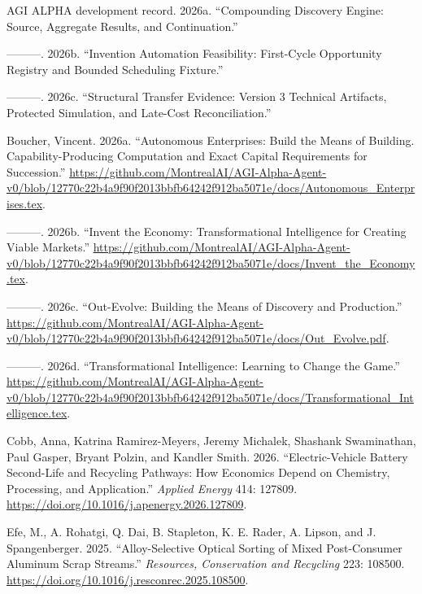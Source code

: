 \label{refs}
\begin{CSLReferences}{1}{0}
AGI ALPHA development record. 2026a. {``Compounding Discovery Engine:
Source, Aggregate Results, and Continuation.''}

---------. 2026b. {``Invention Automation Feasibility: First-Cycle
Opportunity Registry and Bounded Scheduling Fixture.''}

---------. 2026c. {``Structural Transfer Evidence: Version 3 Technical
Artifacts, Protected Simulation, and Late-Cost Reconciliation.''}

Boucher, Vincent. 2026a. {``Autonomous Enterprises: Build the Means of
Building. Capability-Producing Computation and Exact Capital
Requirements for Succession.''}
\url{https://github.com/MontrealAI/AGI-Alpha-Agent-v0/blob/12770c22b4a9f90f2013bbfb64242f912ba5071e/docs/Autonomous_Enterprises.tex}.

---------. 2026b. {``Invent the Economy: Transformational Intelligence
for Creating Viable Markets.''}
\url{https://github.com/MontrealAI/AGI-Alpha-Agent-v0/blob/12770c22b4a9f90f2013bbfb64242f912ba5071e/docs/Invent_the_Economy.tex}.

---------. 2026c. {``Out-Evolve: Building the Means of Discovery and
Production.''}
\url{https://github.com/MontrealAI/AGI-Alpha-Agent-v0/blob/12770c22b4a9f90f2013bbfb64242f912ba5071e/docs/Out_Evolve.pdf}.

---------. 2026d. {``Transformational Intelligence: Learning to Change
the Game.''}
\url{https://github.com/MontrealAI/AGI-Alpha-Agent-v0/blob/12770c22b4a9f90f2013bbfb64242f912ba5071e/docs/Transformational_Intelligence.tex}.

Cobb, Anna, Katrina Ramirez-Meyers, Jeremy Michalek, Shashank
Swaminathan, Paul Gasper, Bryant Polzin, and Kandler Smith. 2026.
{``Electric-Vehicle Battery Second-Life and Recycling Pathways: How
Economics Depend on Chemistry, Processing, and Application.''}
\emph{Applied Energy} 414: 127809.
\url{https://doi.org/10.1016/j.apenergy.2026.127809}.

Efe, M., A. Rohatgi, Q. Dai, B. Stapleton, K. E. Rader, A. Lipson, and
J. Spangenberger. 2025. {``Alloy-Selective Optical Sorting of Mixed
Post-Consumer Aluminum Scrap Streams.''} \emph{Resources, Conservation
and Recycling} 223: 108500.
\url{https://doi.org/10.1016/j.resconrec.2025.108500}.


\end{CSLReferences}
